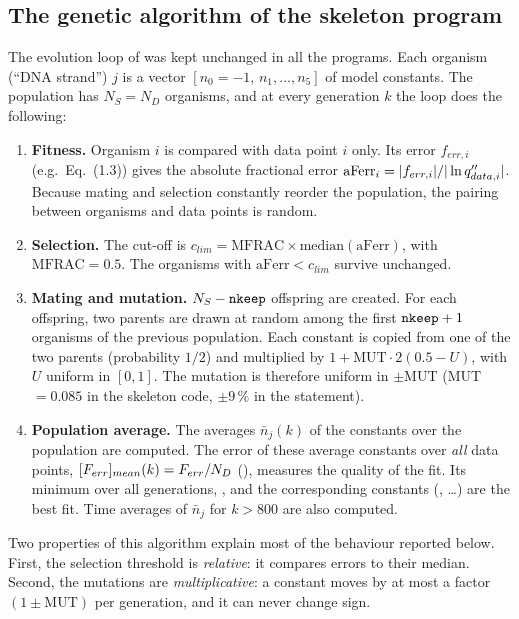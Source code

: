 \subsection{The genetic algorithm of the skeleton program}
\label{sec:ga}
The evolution loop of  was kept unchanged in all the programs. Each organism (``DNA strand'')
$j$ is a vector $[n_0=-1,\,n_1,\dots,n_5]$ of model constants. The population has $N_S=N_D$ organisms,
and at every generation $k$ the loop does the following:
\begin{enumerate}[label=\arabic*.]
  \item \textbf{Fitness.} Organism $i$ is compared with data point $i$ only. Its error
        $f_{err,i}$ (e.g.\ Eq.~(1.3)) gives the absolute fractional error
        $\mathrm{aFerr}_i=|f_{err,i}|/|\ln q''_{data,i}|$. Because mating and selection constantly
        reorder the population, the pairing between organisms and data points is random.
  \item \textbf{Selection.} The cut-off is $c_{lim}=\mathrm{MFRAC}\times\mathrm{median}(\mathrm{aFerr})$,
        with $\mathrm{MFRAC}=0.5$. The  organisms with $\mathrm{aFerr}<c_{lim}$ survive
        unchanged.
  \item \textbf{Mating and mutation.} $N_S-\texttt{nkeep}$ offspring are created. For each offspring, two
        parents are drawn at random among the first $\texttt{nkeep}+1$ organisms of the previous population.
        Each constant is copied from one of the two parents (probability $1/2$) and multiplied by
        $1+\mathrm{MUT}\cdot 2(0.5-U)$, with $U$ uniform in $[0,1]$. The mutation is therefore uniform in
        $\pm\mathrm{MUT}$ (MUT~$=0.085$ in the skeleton code, $\pm9\,\%$ in the statement).
  \item \textbf{Population average.} The averages $\bar n_j(k)$ of the constants over the population are
        computed. The error of these average constants over \emph{all} data points,
        $[F_{err}]_{mean}(k)=F_{err}/N_D$ (), measures the quality of the fit. Its minimum
        over all generations, , and the corresponding constants
        (, \dots) are the best fit. Time averages of $\bar n_j$ for $k>800$ are also computed.
\end{enumerate}
Two properties of this algorithm explain most of the behaviour reported below. First, the selection
threshold is \emph{relative}: it compares errors to their median. Second, the mutations are
\emph{multiplicative}: a constant moves by at most a factor $(1\pm\mathrm{MUT})$ per generation, and it
can never change sign.
